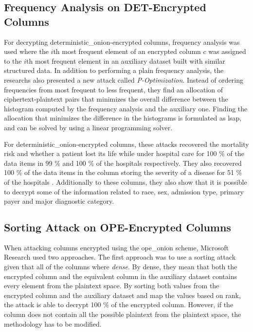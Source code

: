 \subsection{Frequency Analysis on DET-Encrypted Columns}

For decrypting \gls{deterministic_onion}-encrypted columns, frequency analysis was used where the $i$th most frequent element of an encrypted column $c$ was assigned to the $i$th most frequent element in an auxiliary dataset built with similar structured data. In addition to performing a plain frequency analysis, the researchs also presented a new attack called \emph{P-Optimization}. Instead of ordering frequencies from most frequent to less frequent, they find an allocation of ciphertext-plaintext pairs that minimizes the overall difference between the histogram computed by the frequency analysis and the auxiliary one. Finding the allocation that minimizes the difference in the histograms is formulated as \gls{lsap}, and can be solved by using a linear programming solver.

For \gls{deterministic_onion}-encrypted columns, these attacks recovered the mortality risk and whether a patient lost its life while under hospital care for 100 \% of the data items in 99 \% and 100 \% of the hospitals respectively. They also recovered 100 \% of the data items in the column storing the severity of a disease for 51 \% of the hospitals \cite{microsoft_cryptdb}. Additionally to these columns, they also show that it is possible to decrypt some of the information related to race, sex, admission type, primary payer and major diagnostic category.

\subsection{Sorting Attack on OPE-Encrypted Columns}

When attacking columns encrypted using the \gls{ope_onion} scheme, Microsoft Research used two approaches. The first approach was to use a sorting attack given that all of the columns where \emph{dense}. By dense, they mean that both the encrypted column and the equivalent column in the auxiliary dataset contains every element from the plaintext space. By sorting both values from the encrypted column and the auxiliary dataset and map the values based on rank, the attack is able to decrypt 100 \% of the encrypted column. However, if the column does not contain all the possible plaintext from the plaintext space, the methodology has to be modified.

